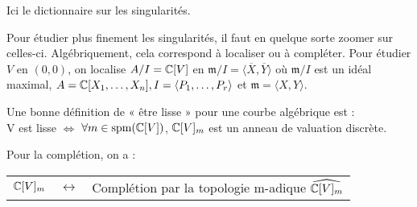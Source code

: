 Ici le dictionnaire sur les singularités.

\begin{exemple}
  
\end{exemple}

\begin{remarque}
  Pour étudier plus finement les singularités, il faut en quelque
  sorte zoomer sur celles-ci. Algébriquement, cela correspond à
  localiser ou à compléter.
  Pour étudier $V$ en $(0,0)$, on localise $A/I=\mathbb{C}[V]$ en
  $\mathfrak{m}/I=\langle \overline{X},\overline{Y}\rangle$ où
  $\mathfrak{m}/I$ est un idéal maximal, $A=\mathbb{C}[X_1,\dotsc,X_n],
  I=\langle P_1,\dotsc,P_r\rangle$ et $\mathfrak{m}=\langle
  X,Y\rangle$. %
\end{remarque}

\begin{definition}
  Une bonne définition de « être lisse » pour une courbe algébrique est : \\
  V est lisse $\iff$ $\forall m\in \operatorname{spm}(\mathbb{C}[V])$, $\mathbb{C}[V]_m$ est un anneau de valuation discrète.
\end{definition}
Pour la complétion, on a :
\begin{table}[h]
  \centering
  \begin{tabular}[h]{ccc}
     $\mathbb{C}[V]_m$ & $\leftrightarrow$ & Complétion par la topologie m-adique $\widehat{\mathbb{C}[V]_m}$
  \end{tabular}
\end{table}
